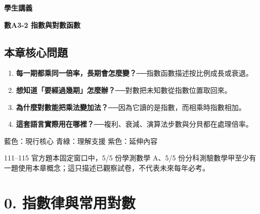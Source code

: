 \documentclass[11pt,a4paper]{article}
\providecommand{\tightlist}{%
  \setlength{\itemsep}{0pt}\setlength{\parskip}{0pt}}
\begin{document}
\begin{tcolorbox}[
  enhanced,colback=white,colframe=HandoutBlue,boxrule=1.1pt,arc=2mm,
  borderline west={3pt}{0pt}{HandoutBlue},left=5mm,right=4mm,top=4mm,bottom=4mm
]
{\sffamily\small\bfseries\color{HandoutBlue}學生講義}\par
{\sffamily\bfseries\LARGE\color{HandoutInk}數A3-2 指數與對數函數}\par
\vspace{0.35em}{\large 用倍率描述變化，再用對數倒推出需要幾步}\par
{}\par
{}\par
\end{tcolorbox}


\begin{HandoutLearningMap}

\subsection{本章核心問題}\label{ux672cux7ae0ux6838ux5fc3ux554fux984c}

\begin{enumerate}
\def\labelenumi{\arabic{enumi}.}
\tightlist
\item
  \textbf{每一期都乘同一倍率，長期會怎麼變？}──指數函數描述按比例成長或衰退。
\item
  \textbf{想知道「要經過幾期」怎麼辦？}──對數把未知數從指數位置取回來。
\item
  \textbf{為什麼對數能把乘法變加法？}──因為它讀的是指數，而相乘時指數相加。
\item
  \textbf{這套語言實際用在哪裡？}──複利、衰減、演算法步數與分貝都在處理倍率。
\end{enumerate}

{藍色：現行核心}
{青綠：理解支援}
{紫色：延伸內容}

111--115 官方題本固定窗口中，5/5 份學測數學 A、5/5 份分科測驗數學甲至少有一題使用本章概念；這只描述已觀察試卷，不代表未來每年必考。

\end{HandoutLearningMap}

\section{0. 指數律與常用對數}\label{ux6307ux6578ux5f8bux8207ux5e38ux7528ux5c0dux6578}
\end{document}
